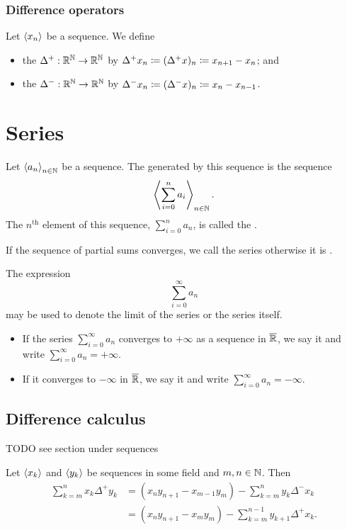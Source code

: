 \subsubsection{Difference operators}
\begin{definition}
Let $\left\langle x_n \right\rangle$ be a sequence. We define
\begin{itemize}
\item the  $\Delta^+: \mathbb{R}^{\mathbb{N}} \to \mathbb{R}^{\mathbb{N}}$ by $\Delta^+ x_n \coloneqq (\Delta^+x)_n \coloneqq x_{n+1} - x_n$; and
\item the  $\Delta^-: \mathbb{R}^{\mathbb{N}} \to \mathbb{R}^{\mathbb{N}}$ by $\Delta^- x_n \coloneqq (\Delta^-x)_n \coloneqq x_{n} - x_{n-1}$.
\end{itemize}
\end{definition}

\section{Series}
\begin{definition}
Let $\left\langle a_n \right\rangle_{n\in \mathbb{N}}$ be a sequence. The  generated by this sequence is the sequence
\[ \left\langle \sum_{i=0}^n a_i \right\rangle_{n\in \mathbb{N}}. \]
The $n^\text{th}$ element of this sequence, $\sum_{i=0}^n a_n$, is called the .

If the sequence of partial sums converges, we call the series  otherwise it is .

The expression
\[ \sum_{i=0}^\infty a_n \]
may be used to denote the limit of the series or the series itself.
\begin{itemize}
\item If the series $\sum_{i=0}^\infty a_n$ converges to $+\infty$ as a sequence in $\overline{\mathbb{R}}$, we say it  and write $\sum_{i=0}^\infty a_n = +\infty$.
\item If it converges to $-\infty$ in $\overline{\mathbb{R}}$, we say it  and write $\sum_{i=0}^\infty a_n = -\infty$.
\end{itemize}
\end{definition}

\subsection{Difference calculus}
TODO see section under sequences

\begin{proposition}
Let $\left\langle x_k \right\rangle$ and $\left\langle y_k \right\rangle$ be sequences in some field and $m,n\in \mathbb{N}$. Then
\begin{align*}
\sum_{k=m}^n x_k\Delta^+y_k &= (x_ny_{n+1} - x_{m-1}y_m)-\sum_{k=m}^ny_k\Delta^-x_k \\
&= (x_ny_{n+1} - x_my_m) - \sum_{k=m}^{n-1}y_{k+1}\Delta^+x_k.
\end{align*}
\end{proposition}

